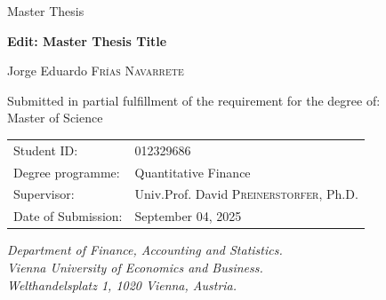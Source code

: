 \documentclass[
  12pt,
  a4paper,
  openany]{scrbook}
\begin{document}
\begin{center}
    \large Master Thesis \\
    \vspace{1cm}

    \textbf{\huge Edit: Master Thesis Title} \\
    \vspace{0.5cm}

        \LARGE Jorge Eduardo \textsc{Frías Navarrete} \\
    \vspace{0.5cm}
        \vspace{2cm}
    
    \normalsize Submitted in partial fulfillment of the requirement for the degree of: \\
    \LARGE Master of Science \\
\vspace{2cm}

\normalsize
    \begin{tabular}{ll}
        Student ID: & 012329686 \\
        Degree programme: & Quantitative Finance \\
        Supervisor: & Univ.Prof. David \textsc{Preinerstorfer}, Ph.D. \\
        Date of Submission: & September 04, 2025
    \end{tabular}
    \vspace{2cm}
    
    \textit{
      Department of Finance, Accounting and Statistics. \\
      Vienna University of Economics and Business. \\
      Welthandelsplatz 1, 1020 Vienna, Austria.
    }

\end{center}

\restoregeometry


% 
\end{document}
